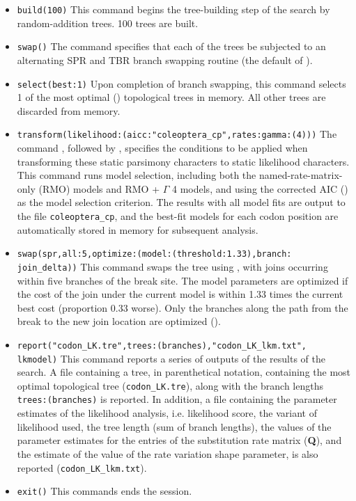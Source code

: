 \begin{itemize}
\item \texttt{build(100)} This command begins the tree-building
step of the search by random-addition trees. 100 trees are built.
\item \texttt{swap()} The  command specifies that
each of the trees be subjected to an alternating SPR and TBR branch
swapping routine (the default of \poy).  
\item \texttt{select(best:1)}
Upon completion of branch swapping, this command selects 1 of the
most optimal () topological trees in memory. All
other trees are discarded from memory.  
\item \texttt{transform(likelihood:(aicc:"coleoptera\_cp",rates:gamma:(4)))} The
command , followed by ,
specifies the conditions to be applied when transforming these
static parsimony characters to static likelihood characters. This
command runs model selection, including both the named-rate-matrix-only
(RMO) models and RMO + $\Gamma$ 4 models, and using the corrected
AIC () as the model selection criterion. The
results with all model fits are output to the file \texttt{coleoptera\_cp},
and the best-fit models for each codon position are automatically
stored in memory for subsequent analysis.  
\item \texttt{swap(spr,all:5,optimize:(model:(threshold:1.33),branch: \\
join\_delta))} This command swaps the tree using ,
with joins occurring within five branches of the break site. The
model parameters are optimized if the cost of the join under the
current model is within 1.33 times the current best cost (proportion
0.33 worse).  Only the branches along the path from the break to
the new join location are optimized ().
\item \texttt{report("codon\_LK.tre",trees:(branches),"codon\_LK\_lkm.txt",\\
lkmodel)} This command reports a series of outputs of the results
of the search.  A file containing a tree, in parenthetical notation,
containing the most optimal topological tree (\texttt{codon\_LK.tre}),
along with the branch lengths \texttt{trees:(branches)} is reported.
In addition, a file containing the parameter estimates of the
likelihood analysis, i.e. likelihood score, the variant of likelihood
used, the tree length (sum of branch lengths), the values of the
parameter estimates for the entries of the substitution rate matrix
(\textbf{Q}), and the estimate of the value of the rate variation
shape parameter, is also reported (\texttt{codon\_LK\_lkm.txt}).
\item \texttt{exit()} This commands ends the \poy session.

\end{itemize}

